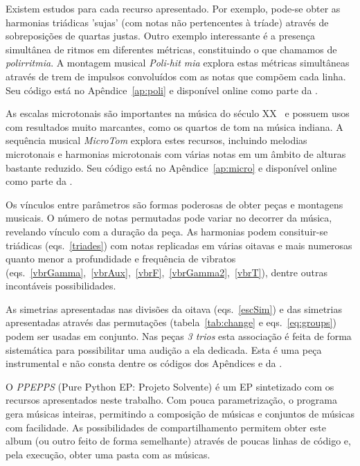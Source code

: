 Existem estudos para cada recurso apresentado. Por exemplo, pode-se obter as harmonias triádicas 'sujas' (com notas não pertencentes à tríade) através de sobreposições de quartas justas. Outro exemplo interessante é a presença simultânea de ritmos em diferentes métricas, constituindo o que chamamos de \emph{polirritmia}. A montagem musical \emph{Poli-hit mia} explora estas métricas simultâneas através de trem de impulsos convoluídos com as notas que compõem cada linha. Seu código está no Apêndice~\ref{ap:poli} e disponível online como parte da \massa.

As escalas microtonais são importantes na música do século XX~\cite{microtonalidade} e possuem usos com resultados muito marcantes, como os quartos de tom na música indiana. A sequência musical \emph{MicroTom} explora estes recursos, incluindo melodias microtonais e harmonias microtonais com várias notas em um âmbito de alturas bastante reduzido. Seu código está no Apêndice~\ref{ap:micro} e disponível online como parte da \massa.

Os vínculos entre parâmetros são formas poderosas de obter peças e montagens musicais. O número de notas permutadas pode variar no decorrer da música, revelando vínculo com a duração da peça. As harmonias podem consituir-se triádicas (eqs.~\ref{triades}) com notas replicadas em várias oitavas e mais numerosas quanto menor a profundidade e frequência de vibratos (eqs.~\ref{vbrGamma},~\ref{vbrAux},~\ref{vbrF},~\ref{vbrGamma2},~\ref{vbrT}), dentre outras incontáveis possibilidades.

As simetrias apresentadas nas divisões da oitava (eqs.~\ref{escSim}) e das simetrias apresentadas através das permutações (tabela~\ref{tab:change} e eqs.~\ref{eq:groups}) podem ser usadas em conjunto. Nas peças \emph{3 trios} esta associação é feita de forma sistemática para possibilitar uma audição a ela dedicada. Esta é uma peça instrumental e não consta dentre os códigos dos Apêndices e da \massa.

O \emph{PPEPPS} (Pure Python EP: Projeto Solvente) é um EP sintetizado com os recursos apresentados neste trabalho. Com pouca parametrização, o programa gera músicas inteiras, permitindo a composição de músicas e conjuntos de músicas com facilidade. As possibilidades de compartilhamento permitem obter este album (ou outro feito de forma semelhante) através de poucas linhas de código e, pela execução, obter uma pasta com as músicas.


